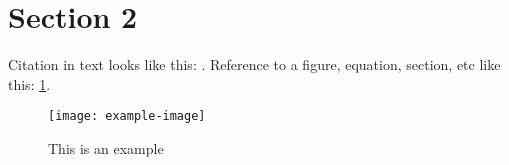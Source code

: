 \section{Section 2}
\label{sec:2}

Citation in text looks like this: \cite{Solcast}. Reference to a figure, equation, section, etc like this: \cref{fig:example-figure}.

\begin{figure}[hb]
	\centering
	\texttt{[image: example-image]}
	\caption{This is an example\cite{MGM_Meteogram}}
	\label{fig:example-figure}
\end{figure}
